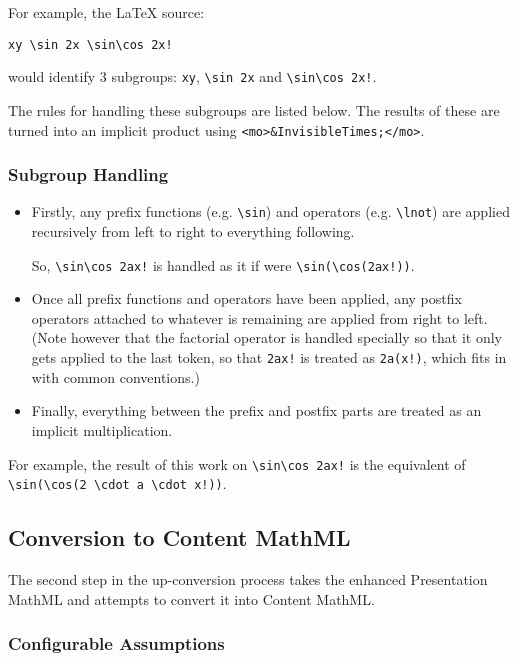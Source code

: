 For example, the LaTeX source:

\begin{verbatim}
xy \sin 2x \sin\cos 2x!
\end{verbatim}

would identify 3 subgroups: \verb|xy|, \verb|\sin 2x| and \verb|\sin\cos 2x!|.

The rules for handling these subgroups are listed below. The results of these
are turned into an implicit product using \verb|<mo>&InvisibleTimes;</mo>|.

\subsubsection*{Subgroup Handling}

\begin{itemize}
\item Firstly, any prefix functions (e.g. \verb|\sin|) and operators (e.g. \verb|\lnot|)
are applied recursively from left to right to everything following.

So, \verb|\sin\cos 2ax!| is handled as it if were \verb|\sin(\cos(2ax!))|.

\item Once all prefix functions and operators have been applied, any postfix operators
attached to whatever is remaining are applied from right to left. (Note however
that the factorial operator is handled specially so that it only gets applied
to the last token, so that \verb|2ax!| is treated as \verb|2a(x!)|, which fits in
with common conventions.)

\item Finally, everything between the prefix and postfix parts are treated as an
implicit multiplication.
\end{itemize}

For example, the result of this work on \verb|\sin\cos 2ax!| is the equivalent of
\verb|\sin(\cos(2 \cdot a \cdot x!))|.

\subsection*{Conversion to Content MathML}

The second step in the up-conversion process takes the enhanced Presentation MathML
and attempts to convert it into Content MathML.

\subsubsection*{Configurable Assumptions}

